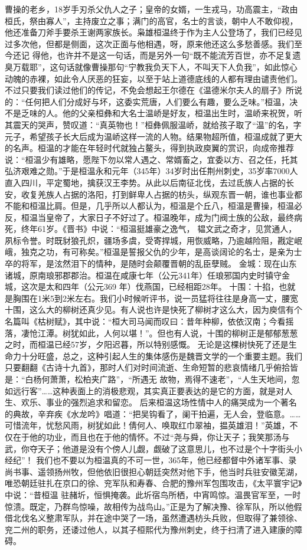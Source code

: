 \documentclass[]{book}
\begin{document}
曹操的老乡，18岁手刃杀父仇人之子；皇帝的女婿，一生戎马，功高震主，``政由桓氏，祭由寡人''，主持废立之事；满门的高官，名士的言谈，朝中人不敢仰视，他还准备刀斧手要杀王谢两家族长。枭雄桓温终于作为主人公登场了，我们已经见过多次他，但都是侧面，这次正面与他相遇，呀，原来他还这么多愁善感。我们至今还记
得他，也许并不是这一句话，而是另外一句``既不能流芳百世，亦不足复遗臭万载耶''，这句话就像曹操那句``宁教我负天下人，不叫天下人负我''，如此惊心动魄的赤裸，如此令人厌恶的狂妄，以至于站上道德底线的人都有理由谴责他们。不过只要我们读过他们的传记，不免会想起王尔德在《温德米尔夫人的扇子》所说的：``任何把人们分成好与坏，这委实荒唐，人们要么有趣，要么乏味。''桓温，决不是乏味的人。他的父亲桓彝和大名士温峤是好友，桓温出生时，温峤来祝贺，听其震天的哭声，赞叹道：``真英物也！''桓彝佩服温峤，就给孩子取了``温''的名，字元子，希望孩子长大后成为温峤这样一流的人物。结果物超所值，桓温成就了更大的名声。桓温的才能在年轻时代就独占鳌头，得到执政庾翼的赏识，向成帝推荐说：``桓温少有雄略，愿陛下勿以常人遇之、常婿畜之，宜委以方、召之任，托其弘济艰难之勋。''于是桓温永和元年（345年）34岁时出任荆州刺史，35岁率7000人直入四川，平定蜀地，擒获汉王李势。从此以后南征北伐，去过氐族人占据的长安，收复羌族人占据的洛阳，打到鲜卑人占据的枋头，纵观东晋一朝，谁也事业都不能和桓温比肩。但是，几乎所以人都认为，桓温是个丘八，桓温是曹操，桓温必反，桓温当皇帝了，大家日子不好过了。桓温晚年，成为门阀士族的公敌，最终病死，终年61岁。《晋书》中说：``桓温挺雄豪之逸气，
韫文武之奇才，见赏通人，夙标令誉。时既豺狼孔炽，疆场多虞，受寄捍城，用恢威略，乃逾越险阻，戡定岷峨，独克之功，有可称矣。''桓温是誓报父仇的少年，是高谈阔论的名士，是亲为士卒的将军，是泫然泪下的情种，是随时会颠覆晋朝的乱臣孽贼。
金城：现在山东诸城，原南琅邪郡郡治。桓温在咸康七年（公元341年）任琅邪国内史时镇守金城，这次是太和四年（公元369
年）伐燕国，已经相距28年。
十围：十掐，也就是胸围在1米5到2米左右。我们小时候听评书，说一员猛将往往是身高一丈，腰宽十围，这么大的柳树还真少见。有人说也许是快死了柳树才这么大，因为庾信有个名篇叫《枯树赋》，其中说：``桓大司马闻而叹曰：昔年种柳，依依汉南；今看摇落，凄怆江潭。树犹如此，人何以堪！''。但也有人说，十围的柳树正是郁郁葱葱之时，而桓温已经57岁，夕阳迟暮，所以特别感慨。
无论是这棵树快死了还是生命力十分旺盛，总之，这种引起人生的集体感伤是魏晋文学的一个重要主题。我们只要翻翻《古诗十九首》，那时人们对时间流逝、生命短暂的悲哀情绪几乎俯拾皆是：``白杨何萧萧，松柏夹广路''，``所遇无
故物，焉得不速老''，``人生天地间，忽如远行客''\ldots{}\ldots{}这种表面上的消极悲观，其实真正要表达的是它的方面，就是对人生、欢乐、事业的强烈追求和留恋。
后来桓温这场性情中人的痛哭成为一个著名的典故，辛弃疾《水龙吟》唱道：``把吴钩看了，阑干拍遍，无人会，登临意。\ldots{}\ldots{}可惜流年，忧愁风雨，树犹如此！倩何人、唤取红巾翠袖，揾英雄泪！''英雄，不仅在于他的功业，而且也在于他的情怀。不过``尧与舜，你让天子；我笑那汤与武，你夺天子；他道是没有个傍人儿觑，觑破了这意思儿，也不过是个十字街头小经纪''！
我们也不要以为桓温真的不可一世，365年，他已经都督中外诸军事、录尚书事、遥领扬州牧，但他依旧很担心朝廷突然对他下手，他当时兵驻安徽芜湖，唯恐朝廷驻扎在京口的徐、兖军队和寿春、合肥的豫州军包围攻击，《太平寰宇记》中说：``昔桓温
驻赭圻，恒惧掩袭。此圻宿鸟所栖，中宵鸣惊。温畏官军至，一时惊溃。既定，乃群鸟惊噪，故相传为战鸟山。''正是为了解决豫、徐军队，所以他假借北伐名义整肃军队，并在途中哭了一场，虽然遭遇枋头兵败，但取得了兼领徐、兖二州的职务，还诿过他人，以其子桓熙代为豫州刺史，终于扫清了进入建康的障碍。
\end{document}
